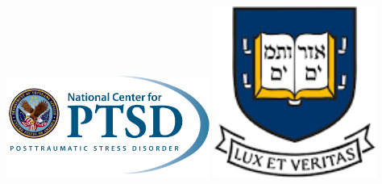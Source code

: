 \documentclass[]{betterposter}
\begin{document}
{\begin{flushright}
\includegraphics[width=0.5\textwidth]{img/NCPTSD_Logo.png}
\hfill
\includegraphics[width=0.4\textwidth]{img/Yale.png}
\end{flushright}

}
\end{document}
